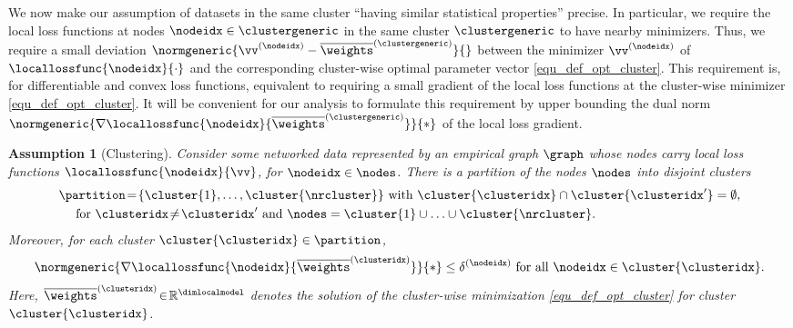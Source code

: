\documentclass[lettersize,journal]{IEEEtran}
\newcommand\clusteropterr[1]{\delta^{(#1)}}
\newtheorem{assumption}{Assumption}
\begin{document}
We now make our assumption of datasets in the same cluster ``having similar statistical properties'' precise. 
In particular, we require the local loss functions at nodes $\nodeidx \in \clustergeneric$ in the same cluster $\clustergeneric$ 
to have nearby minimizers. Thus, we require a small deviation $\normgeneric{\vv^{(\nodeidx)} - \overline{\weights}^{(\clustergeneric)}}{}$ 
between the minimizer $\vv^{(\nodeidx)}$ of $\locallossfunc{\nodeidx}{\cdot}$ and the corresponding 
cluster-wise optimal parameter vector \eqref{equ_def_opt_cluster}. This requirement is, for differentiable and convex loss 
functions, equivalent to requiring a small gradient of the local loss functions at the cluster-wise 
minimizer \eqref{equ_def_opt_cluster}. It will be convenient for our analysis to formulate this 
requirement by upper bounding the dual norm $\normgeneric{\nabla \locallossfunc{\nodeidx}{\overline{\weights}^{(\clustergeneric)}} }{*}$ 
of the local loss gradient. 
\begin{assumption}[Clustering]
\label{asspt_weights_clustered}
Consider some networked data represented by an empirical graph $\graph$ whose nodes 
carry local loss functions $\locallossfunc{\nodeidx}{\vv}$, for $\nodeidx \in \nodes$. 
There is a partition of the nodes $\nodes$ into disjoint clusters 
\begin{equation}
\label{equ_def_parition_asspt}
\begin{aligned}
 &{\partition\!=\!\{\cluster{1},\ldots,\cluster{\nrcluster} \} \mbox{ with } \cluster{\clusteridx} \cap \cluster{\clusteridx'} = \emptyset ,} \\
 &{ \quad \mbox{ for } \clusteridx\!\neq\!\clusteridx' \mbox{ and } \nodes = \cluster{1} \cup \ldots \cup \cluster{\nrcluster}.} 
\end{aligned}
 \vspace{-2mm}
\end{equation} 
Moreover, for each cluster $\cluster{\clusteridx}\in \partition$, 
\begin{equation}
\label{equ_upper_bound_norm_gradient}
\normgeneric{\nabla \locallossfunc{\nodeidx}{\overline{\weights}^{(\clusteridx)}} }{*}  \leq \clusteropterr{\nodeidx} \mbox{ for all } \nodeidx \in \cluster{\clusteridx}. 
 \vspace{-2mm}
\end{equation}
Here, $\overline{\weights}^{(\clusteridx)}\!\in\!\mathbb{R}^{\dimlocalmodel}$ denotes the solution of the cluster-wise minimization
\eqref{equ_def_opt_cluster} for cluster $\cluster{\clusteridx}$. 
\end{assumption} 
\end{document}
